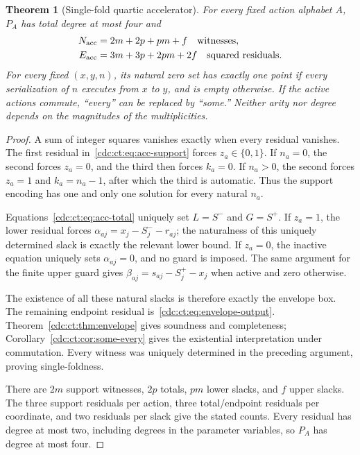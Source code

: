 \documentclass[11pt,a4paper]{article}
\newtheorem{theorem}{Theorem}[section]
\theoremstyle{definition}
\theoremstyle{remark}
\begin{document}
\begin{theorem}[Single-fold quartic accelerator]\label{cdc:ct:thm:accelerator}
For every fixed action alphabet $A$, $P_A$ has total degree at most four and
\begin{align}
 N_{\rm acc}&=2m+2p+pm+f \quad\text{witnesses},\label{cdc:ct:eq:acc-N}\\
 E_{\rm acc}&=3m+3p+2pm+2f \quad\text{squared residuals}.
 \label{cdc:ct:eq:acc-E}
\end{align}
For every fixed $(x,y,n)$, its natural zero set has exactly one point if every serialization of $n$ executes from $x$ to $y$, and is empty otherwise. If the active actions commute, ``every'' can be replaced by ``some.'' Neither arity nor degree depends on the magnitudes of the multiplicities.
\end{theorem}
\begin{proof}
A sum of integer squares vanishes exactly when every residual vanishes. The first residual in~\eqref{cdc:ct:eq:acc-support} forces $z_a\in\{0,1\}$. If $n_a=0$, the second forces $z_a=0$, and the third then forces $k_a=0$. If $n_a>0$, the second forces $z_a=1$ and $k_a=n_a-1$, after which the third is automatic. Thus the support encoding has one and only one solution for every natural $n_a$.

Equations~\eqref{cdc:ct:eq:acc-total} uniquely set $L=S^-$ and $G=S^+$. If $z_a=1$, the lower residual forces
$\alpha_{aj}=x_j-S_j^--r_{aj}$; the naturalness of this uniquely determined slack is exactly the relevant lower bound. If $z_a=0$, the inactive equation uniquely sets $\alpha_{aj}=0$, and no guard is imposed. The same argument for the finite upper guard gives
$\beta_{aj}=s_{aj}-S_j^+-x_j$ when active and zero otherwise.

The existence of all these natural slacks is therefore exactly the envelope box. The remaining endpoint residual is~\eqref{cdc:ct:eq:envelope-output}. Theorem~\ref{cdc:ct:thm:envelope} gives soundness and completeness; Corollary~\ref{cdc:ct:cor:some-every} gives the existential interpretation under commutation. Every witness was uniquely determined in the preceding argument, proving single-foldness.

There are $2m$ support witnesses, $2p$ totals, $pm$ lower slacks, and $f$ upper slacks. The three support residuals per action, three total/endpoint residuals per coordinate, and two residuals per slack give the stated counts. Every residual has degree at most two, including degrees in the parameter variables, so $P_A$ has degree at most four.
\end{proof}
\end{document}
